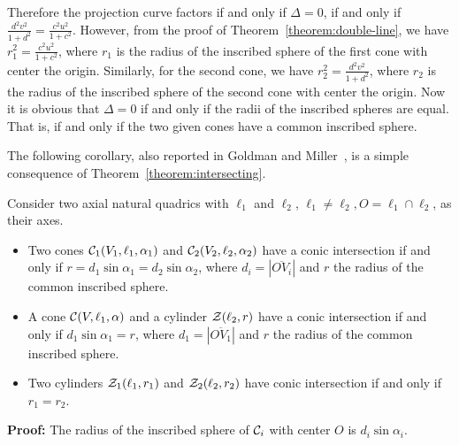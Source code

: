 Therefore the projection curve factors if and only if $\Delta=0$,  if and only
if $\frac{d^2v^2}{1+d^2}=\frac{c^2u^2}{1+c^2}$.  However, from the proof of
Theorem~\ref{theorem:double-line}, we have $r_1^2=\frac{c^2u^2}{1+c^2}$,
where $r_1$ is the radius of the inscribed sphere of the first cone with
center the origin.
Similarly, for the second cone, we have
$r_2^2=\frac{d^2v^2}{1+d^2}$,
where $r_2$ is the radius of the inscribed sphere of the second cone
with center the origin.
Now it is obvious that $\Delta=0$ if and only
if the radii of the inscribed spheres are equal.  That is, if and only if
the two given cones have a common inscribed sphere. \QED

    The following corollary, also reported in
Goldman and Miller~\cite{g-m:1990,g-m:1991a}, is a simple
consequence of Theorem~\ref{theorem:intersecting}.

\begin{corollary}
     Consider two axial natural quadrics with $\ell_1$ and $\ell_2$,
$\ell_1\neq\ell_2, O=\ell_1\cap\ell_2$,  as their axes.
\begin{itemize}
     \item Two cones ${\cal C}_1(V_1,\ell_1,\alpha_1)$ and
          ${\cal C}_2(V_2,\ell_2,\alpha_2)$ have a conic intersection
          if and only if $r=d_1\sin\alpha_1=d_2\sin\alpha_2$, where
          $d_i=|\overline{OV_i}|$ and $r$ the radius of the common
          inscribed sphere.
     \item A cone ${\cal C}(V,\ell_1,\alpha)$ and a cylinder
          ${\cal Z}(\ell_2,r)$ have a conic intersection if and only if
          $d_1\sin\alpha_1=r$, where $d_1=|\overline{OV_1}|$
          and $r$ the radius of the common inscribed sphere.
     \item Two cylinders ${\cal Z}_1(\ell_1,r_1)$ and
          ${\cal Z}_2(\ell_2,r_2)$ have conic intersection if and only
          if $r_1=r_2$.
\end{itemize}
\end{corollary}
{\bf Proof:}
The radius of the inscribed sphere of ${\cal C}_i$ with center $O$
is $d_i\sin\alpha_i$.
\QED

